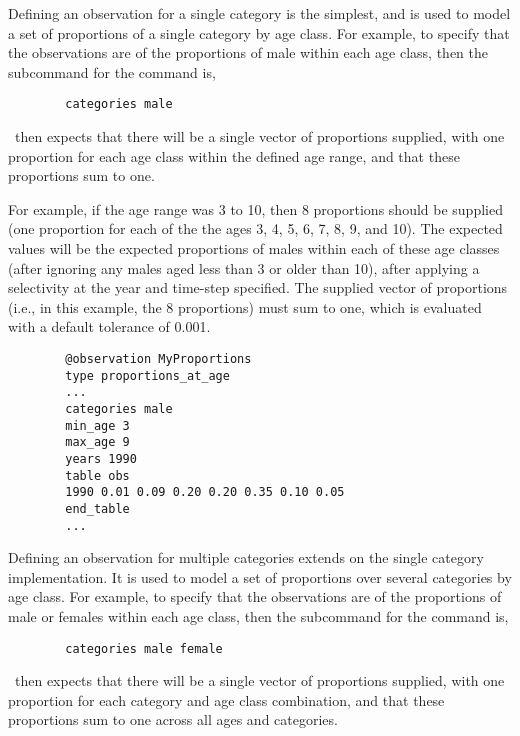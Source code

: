 Defining an observation for a single category is the simplest, and is used to model a set of proportions of a single category by age class. For example, to specify that the observations are of the proportions of male within each age class, then the subcommand  for the  command is,

{\small{\begin{verbatim}
		categories male
		\end{verbatim}}}

\CNAME\ then expects that there will be a single vector of proportions supplied, with one proportion for each age class within the defined age range, and that these proportions sum to one. 

For example, if the age range was 3 to 10, then 8 proportions should be supplied (one proportion for each of the the ages 3, 4, 5, 6, 7, 8, 9, and 10). The expected values will be the expected proportions of males within each of these age classes (after ignoring any males aged less than 3 or older than 10), after applying a selectivity at the year and time-step specified. The supplied vector of proportions (i.e., in this example, the 8 proportions) must sum to one, which is evaluated with a default tolerance of 0.001. 


{\small{\begin{verbatim}
		@observation MyProportions
		type proportions_at_age
		...
		categories male
		min_age 3
		max_age 9
		years 1990
		table obs
		1990 0.01 0.09 0.20 0.20 0.35 0.10 0.05
		end_table
		...
		\end{verbatim}}}


Defining an observation for multiple categories extends on the single category implementation. It is used to model a set of proportions over several categories by age class. For example, to specify that the observations are of the proportions of male or females within each age class, then the subcommand  for the  command is,

{\small{\begin{verbatim}
		categories male female
		\end{verbatim}}}

\CNAME\ then expects that there will be a single vector of proportions supplied, with one proportion for each category and age class combination, and that these proportions sum to one across all ages and categories.

